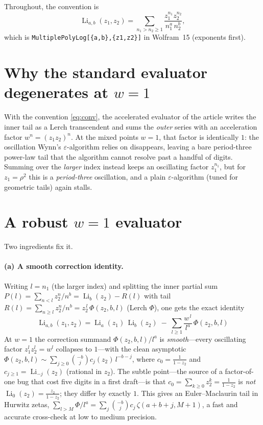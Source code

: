 \documentclass[11pt]{article}
\DeclareMathOperator{\Li}{Li}
\newcommand{\rr}{\rho}
\newcommand{\code}[1]{\texttt{\small #1}}
\theoremstyle{plain}
\theoremstyle{remark}
\begin{document}
Throughout, the convention is
\begin{equation}\label{eq:conv}
  \Li_{a,b}(z_1,z_2)=\sum_{n_1>n_2\ge1}\frac{z_1^{n_1}z_2^{n_2}}{n_1^{a}\,n_2^{b}},
\end{equation}
which is \code{MultiplePolyLog[\{a,b\},\{z1,z2\}]} in Wolfram~15 (exponents first).

\section{Why the standard evaluator degenerates at \texorpdfstring{$w=1$}{w=1}}\label{sec:why}

With the convention \eqref{eq:conv}, the accelerated evaluator of the article writes the inner tail as
a Lerch transcendent and sums the \emph{outer} series with an acceleration factor $w^n=(z_1z_2)^n$. At
the mixed points $w=1$, that factor is identically $1$: the oscillation Wynn's $\varepsilon$-algorithm
relies on disappears, leaving a bare period-three power-law tail that the algorithm cannot resolve past
a handful of digits. Summing over the \emph{larger} index instead keeps an oscillating factor
$z_1^{n_1}$, but for $z_1=\rr^2$ this is a \emph{period-three} oscillation, and a plain
$\varepsilon$-algorithm (tuned for geometric tails) again stalls.

\section{A robust \texorpdfstring{$w=1$}{w=1} evaluator}\label{sec:eval}

Two ingredients fix it.

\paragraph{(a) A smooth correction identity.} Writing $l=n_1$ (the larger index) and splitting the
inner partial sum $P(l)=\sum_{n<l}z_2^n/n^b=\Li_b(z_2)-R(l)$ with tail
$R(l)=\sum_{n\ge l}z_2^n/n^b=z_2^{\,l}\,\Phi(z_2,b,l)$ (Lerch $\Phi$), one gets the exact identity
\begin{equation}\label{eq:smooth}
  \boxed{\;\Li_{a,b}(z_1,z_2)=\Li_a(z_1)\,\Li_b(z_2)\;-\;\sum_{l\ge1}\frac{w^{\,l}}{l^{a}}\,\Phi(z_2,b,l)\;}
\end{equation}
At $w=1$ the correction summand $\Phi(z_2,b,l)/l^a$ is \emph{smooth}---every oscillating factor
$z_1^l z_2^l=w^l$ collapses to $1$---with the clean asymptotic
$\Phi(z_2,b,l)\sim\sum_{j\ge0}\binom{-b}{j}c_j(z_2)\,l^{-b-j}$, where $c_0=\tfrac1{1-z_2}$ and
$c_{j\ge1}=\Li_{-j}(z_2)$ (rational in $z_2$). The subtle point---the source of a factor-of-one bug
that cost five digits in a first draft---is that $c_0=\sum_{k\ge0}z_2^k=\tfrac1{1-z_2}$ is \emph{not}
$\Li_0(z_2)=\tfrac{z_2}{1-z_2}$; they differ by exactly $1$. This gives an Euler--Maclaurin tail in
Hurwitz zetas, $\sum_{l>M}\Phi/l^a=\sum_j\binom{-b}{j}c_j\,\zeta(a+b+j,M+1)$, a fast and accurate
cross-check at low to medium precision.
\end{document}
